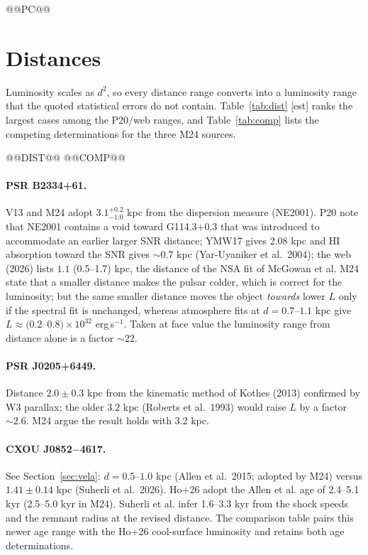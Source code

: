\documentclass[11pt,a4paper]{article}
\newcommand{\src}[1]{\textsf{[#1]}}
\begin{document}
@@PC@@

\section{Distances}\label{sec:dist}
Luminosity scales as $d^2$, so every distance range converts into a luminosity range that the quoted statistical errors do not contain. Table~\ref{tab:dist} \src{est} ranks the largest cases among the P20/web ranges, and Table~\ref{tab:comp} lists the competing determinations for the three M24 sources.

@@DIST@@
@@COMP@@

\paragraph{PSR B2334+61.} V13 and M24 adopt $3.1^{+0.2}_{-1.0}$ kpc from the dispersion measure (NE2001). P20 note that NE2001 contains a void toward G114.3+0.3 that was introduced to accommodate an earlier larger SNR distance; YMW17 gives 2.08 kpc and HI absorption toward the SNR gives $\sim0.7$ kpc (Yar-Uyaniker et al.\ 2004); the web (2026) lists $1.1$ (0.5--1.7) kpc, the distance of the NSA fit of McGowan et al. M24 state that a smaller distance makes the pulsar colder, which is correct for the luminosity; but the same smaller distance moves the object \emph{towards} lower $L$ only if the spectral fit is unchanged, whereas atmosphere fits at $d=0.7$--$1.1$ kpc give $L\approx(0.2$--$0.8)\times10^{32}$ erg\,s$^{-1}$. Taken at face value the luminosity range from distance alone is a factor $\sim22$.

\paragraph{PSR J0205+6449.} Distance $2.0\pm0.3$ kpc from the kinematic method of Kothes (2013) confirmed by W3 parallax; the older $3.2$ kpc (Roberts et al.\ 1993) would raise $L$ by a factor $\sim2.6$. M24 argue the result holds with $3.2$ kpc.

\paragraph{CXOU J0852$-$4617.} See Section~\ref{sec:vela}: $d=0.5$--$1.0$ kpc (Allen et al.\ 2015; adopted by M24) versus $1.41\pm0.14$ kpc (Suherli et al.\ 2026). Ho+26 adopt the Allen et al. age of 2.4--5.1 kyr (2.5--5.0 kyr in M24). Suherli et al. infer 1.6--3.3 kyr from the shock speeds and the remnant radius at the revised distance. The comparison table pairs this newer age range with the Ho+26 cool-surface luminosity and retains both age determinations.
\end{document}
